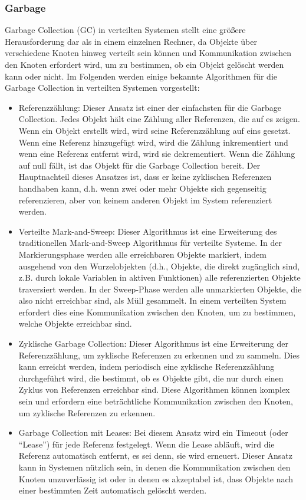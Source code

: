 \subsubsection{Garbage}
Garbage Collection (GC) in verteilten Systemen stellt eine größere Herausforderung dar als in einem einzelnen Rechner, da Objekte über verschiedene Knoten hinweg verteilt sein können und Kommunikation zwischen den Knoten erfordert wird, um zu bestimmen, ob ein Objekt gelöscht werden kann oder nicht. Im Folgenden werden einige bekannte Algorithmen für die Garbage Collection in verteilten Systemen vorgestellt:
\begin{itemize}
\item Referenzzählung: Dieser Ansatz ist einer der einfachsten für die Garbage Collection. Jedes Objekt hält eine Zählung aller Referenzen, die auf es zeigen. Wenn ein Objekt erstellt wird, wird seine Referenzzählung auf eins gesetzt. Wenn eine Referenz hinzugefügt wird, wird die Zählung inkrementiert und wenn eine Referenz entfernt wird, wird sie dekrementiert. Wenn die Zählung auf null fällt, ist das Objekt für die Garbage Collection bereit. Der Hauptnachteil dieses Ansatzes ist, dass er keine zyklischen Referenzen handhaben kann, d.h. wenn zwei oder mehr Objekte sich gegenseitig referenzieren, aber von keinem anderen Objekt im System referenziert werden.
\item Verteilte Mark-and-Sweep: Dieser Algorithmus ist eine Erweiterung des traditionellen Mark-and-Sweep Algorithmus für verteilte Systeme. In der Markierungsphase werden alle erreichbaren Objekte markiert, indem ausgehend von den Wurzelobjekten (d.h., Objekte, die direkt zugänglich sind, z.B. durch lokale Variablen in aktiven Funktionen) alle referenzierten Objekte traversiert werden. In der Sweep-Phase werden alle unmarkierten Objekte, die also nicht erreichbar sind, als Müll gesammelt. In einem verteilten System erfordert dies eine Kommunikation zwischen den Knoten, um zu bestimmen, welche Objekte erreichbar sind.
\item Zyklische Garbage Collection: Dieser Algorithmus ist eine Erweiterung der Referenzzählung, um zyklische Referenzen zu erkennen und zu sammeln. Dies kann erreicht werden, indem periodisch eine zyklische Referenzzählung durchgeführt wird, die bestimmt, ob es Objekte gibt, die nur durch einen Zyklus von Referenzen erreichbar sind. Diese Algorithmen können komplex sein und erfordern eine beträchtliche Kommunikation zwischen den Knoten, um zyklische Referenzen zu erkennen.
\item Garbage Collection mit Leases: Bei diesem Ansatz wird ein Timeout (oder \enquote{Lease}) für jede Referenz festgelegt. Wenn die Lease abläuft, wird die Referenz automatisch entfernt, es sei denn, sie wird erneuert. Dieser Ansatz kann in Systemen nützlich sein, in denen die Kommunikation zwischen den Knoten unzuverlässig ist oder in denen es akzeptabel ist, dass Objekte nach einer bestimmten Zeit automatisch gelöscht werden.

\end{itemize}
